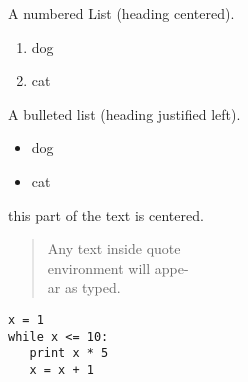 \documentclass{article}
\begin{document}
\begin{center}
A numbered List (heading centered).
\end{center}

\begin{enumerate}
\item dog
\item cat
\end{enumerate}

\begin{flushleft}
A bulleted list (heading justified left).
\end{flushleft}

\begin{itemize}
\item dog
\item cat
\end{itemize}

\begin{flushright}
this part of the text is centered.
\end{flushright}

\begin{quote}
Any text inside quote\\
environment will appe-\\
ar as typed.\\
\end{quote}

\begin{verbatim}
x = 1
while x <= 10:
   print x * 5
   x = x + 1
\end{verbatim}
\end{document}
